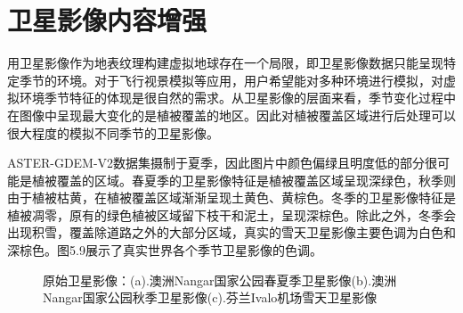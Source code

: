 \section{卫星影像内容增强}
用卫星影像作为地表纹理构建虚拟地球存在一个局限，即卫星影像数据只能呈现特定季节的环境。对于飞行视景模拟等应用，用户希望能对多种环境进行模拟，对虚拟环境季节特征的体现是很自然的需求。从卫星影像的层面来看，季节变化过程中在图像中呈现最大变化的是植被覆盖的地区。因此对植被覆盖区域进行后处理可以很大程度的模拟不同季节的卫星影像。\par
ASTER-GDEM-V2数据集摄制于夏季，因此图片中颜色偏绿且明度低的部分很可能是植被覆盖的区域。春夏季的卫星影像特征是植被覆盖区域呈现深绿色，秋季则由于植被枯黄，在植被覆盖区域渐渐呈现土黄色、黄棕色。冬季的卫星影像特征是植被凋零，原有的绿色植被区域留下枝干和泥土，呈现深棕色。除此之外，冬季会出现积雪，覆盖除道路之外的大部分区域，真实的雪天卫星影像主要色调为白色和深棕色。图5.9展示了真实世界各个季节卫星影像的色调。
\begin{figure}[!h]
    \centering

    \caption{原始卫星影像：(a).澳洲Nangar国家公园春夏季卫星影像\supercite{nangar}(b).澳洲Nangar国家公园秋季卫星影像\supercite{nangar}(c).芬兰Ivalo机场雪天卫星影像\supercite{thaws}}
\end{figure}

